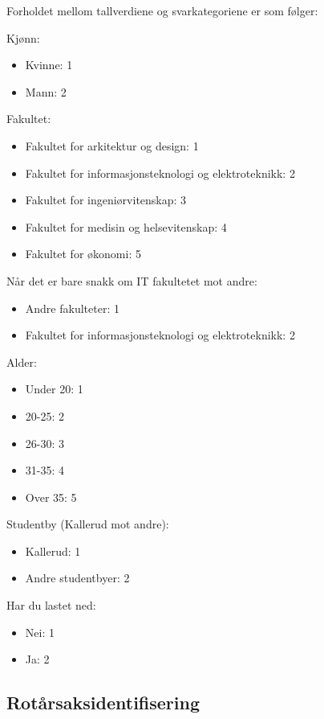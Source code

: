 Forholdet mellom tallverdiene og svarkategoriene er som følger:

Kjønn:
\begin{itemize}
    \item Kvinne: 1
    \item Mann: 2
\end{itemize}

Fakultet:
\begin{itemize}
    \item Fakultet for arkitektur og design: 1
    \item Fakultet for informasjonsteknologi og elektroteknikk: 2
    \item Fakultet for ingeniørvitenskap: 3
    \item Fakultet for medisin og helsevitenskap: 4
    \item Fakultet for økonomi: 5
\end{itemize}

Når det er bare snakk om IT fakultetet mot andre:
\begin{itemize}
    \item Andre fakulteter: 1
    \item Fakultet for informasjonsteknologi og elektroteknikk: 2
\end{itemize}

Alder:
\begin{itemize}
    \item Under 20: 1
    \item 20-25: 2
    \item 26-30: 3
    \item 31-35: 4
    \item Over 35: 5
\end{itemize}

Studentby (Kallerud mot andre):
\begin{itemize}
    \item Kallerud: 1
    \item Andre studentbyer: 2
\end{itemize}

Har du lastet ned:
\begin{itemize}
    \item Nei: 1
    \item Ja: 2
\end{itemize}


\subsection{Rotårsaksidentifisering}


